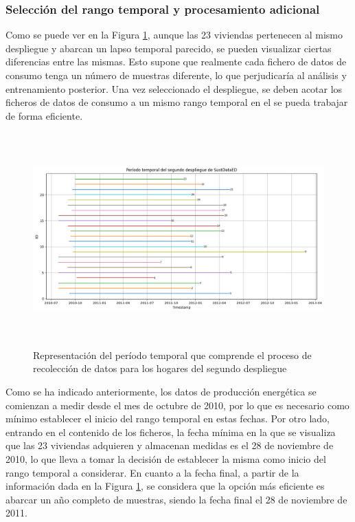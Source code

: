 \subsubsection{Selección del rango temporal y procesamiento adicional}
\label{sec:rango}
Como se puede ver en la Figura \ref{fig:despliegue2}, aunque las 23 viviendas pertenecen al mismo despliegue y abarcan un lapso temporal parecido, se pueden visualizar ciertas diferencias entre las mismas. Esto supone que realmente cada fichero de datos de consumo tenga un número de muestras diferente, lo que perjudicaría al análisis y entrenamiento posterior. Una vez seleccionado el despliegue, se deben acotar los ficheros de datos de consumo a un mismo rango temporal en el se pueda trabajar de forma eficiente. 

\vspace{3mm}

\begin{figure}[H]
    \centering
    \includegraphics[width=1\textwidth,height=8.2cm]{img/diseno/despliegue2.png}
    \caption{Representación del período temporal que comprende el proceso de recolección de datos para los hogares del segundo despliegue}
    \label{fig:despliegue2}
\end{figure}

\vspace{3mm}

Como se ha indicado anteriormente, los datos de producción energética se comienzan a medir desde el mes de octubre de 2010, por lo que es necesario como mínimo establecer el inicio del rango temporal en estas fechas. Por otro lado, entrando en el contenido de los ficheros, la fecha mínima en la que se visualiza que las 23 viviendas adquieren y almacenan medidas es el 28 de noviembre de 2010, lo que lleva a tomar la decisión de establecer la misma como inicio del rango temporal a considerar. En cuanto a la fecha final, a partir de la información dada en la Figura \ref{fig:despliegue2}, se considera que la opción más eficiente es abarcar un año completo de muestras, siendo la fecha final el 28 de noviembre de 2011. 

